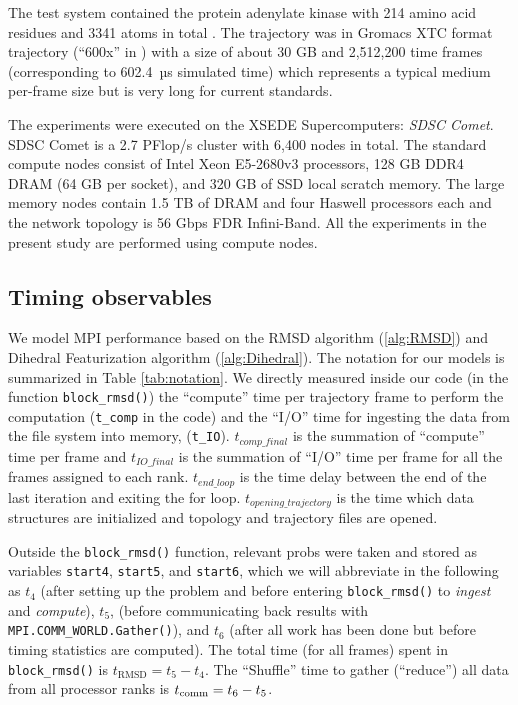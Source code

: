 \label{methods}
The test system contained the protein adenylate kinase with 214 amino acid residues and 3341 atoms in total \citep{Seyler:2014il}. 
The trajectory was in Gromacs XTC format trajectory (``600x'' in \citet{Khoshlessan:2017ab}) with a size of about 30 GB and 2,512,200
time frames (corresponding to 602.4~µs simulated time) which represents a typical medium per-frame size but is very long for
current standards.

The experiments were executed on the XSEDE Supercomputers: \emph{SDSC Comet}. 
SDSC Comet is a 2.7 PFlop/s cluster with 6,400 nodes in total.
The standard compute nodes consist of Intel Xeon E5-2680v3 processors, 128 GB DDR4 DRAM (64 GB per socket), and 320 GB of SSD local scratch memory. 
The large memory nodes contain 1.5 TB of DRAM and four Haswell processors each and the network topology is 56 Gbps FDR Infini-Band.
All the experiments in the present study are performed using compute nodes.

\subsection*{Timing observables}
We model MPI performance based on the RMSD algorithm (\ref{alg:RMSD}) and Dihedral Featurization algorithm (\ref{alg:Dihedral}). 
The notation for our models is summarized in Table \ref{tab:notation}.
We directly measured inside our code (in the function \texttt{block\_rmsd()}) the ``compute'' time per
trajectory frame to perform the computation (\texttt{t\_comp} in the code) and the ``I/O'' time for
ingesting the data from the file system into memory, (\texttt{t\_IO}). 
$t_{comp\_final}$ is the summation of ``compute'' time per frame and $t_{IO\_final}$ is the summation of ``I/O'' time per frame for all the frames assigned to each rank. 
$t_{end\_loop}$ is the time delay between the end of the last iteration and exiting the for loop.
$t_{opening\_trajectory}$ is the time which data structures are initialized and topology and trajectory files are opened.

Outside the \texttt{block\_rmsd()} function, relevant probs were taken and stored as variables \texttt{start4},
\texttt{start5}, and \texttt{start6}, which we will abbreviate in the following as $t_{4}$ (after setting up the problem
and before entering \texttt{block\_rmsd()} to \emph{ingest} and \emph{compute}), $ t_{5}$, (before communicating back results with
\texttt{MPI.COMM\_WORLD.Gather()}), and $t_{6}$ (after all work has been done but before timing statistics are computed).  
The total time (for all frames) spent in \texttt{block\_rmsd()} is $t_{\text{RMSD}} = t_{5} - t_{4}$. 
The ``Shuffle'' time to gather (``reduce'') all data from all processor ranks is $t_{\text{comm}} = t_{6} - t_{5}$.

